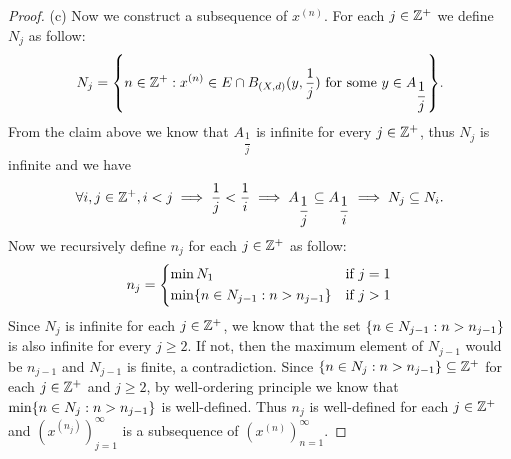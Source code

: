 \begin{proof}{(c)}
  Now we construct a subsequence of \(x^{(n)}\).
  For each \(j \in \mathbb{Z}^+\) we define \(N_j\) as follow:
  \[
    N_j = \set{n \in \Z^+ : x^{(n)} \in E \cap B_{(X, d)}(y, \dfrac{1}{j}) \text{ for some } y \in A_{\dfrac{1}{j}}}.
  \]
  From the claim above we know that \(A_{\dfrac{1}{j}}\) is infinite for every \(j \in \mathbb{Z}^+\), thus \(N_j\) is infinite and we have
  \[
    \forall i, j \in \mathbb{Z}^+, i < j \implies \dfrac{1}{j} < \dfrac{1}{i} \implies A_{\dfrac{1}{j}} \subseteq A_{\dfrac{1}{i}} \implies N_j \subseteq N_i.
  \]
  Now we recursively define \(n_j\) for each \(j \in \mathbb{Z}^+\) as follow:
  \[
    n_j = \begin{dcases}
      \min N_1                                  & \text{if } j = 1 \\
      \min\set{n \in N_{j - 1} : n > n_{j - 1}} & \text{if } j > 1
    \end{dcases}
  \]
  Since \(N_j\) is infinite for each \(j \in \mathbb{Z}^+\), we know that the set \(\left\lbrace n \in N_{j - 1} : n > n_{j - 1}\right\rbrace\) is also infinite for every \(j \geq 2\).
  If not, then the maximum element of \(N_{j - 1}\) would be \(n_{j - 1}\) and \(N_{j - 1}\) is finite, a contradiction.
  Since \(\left\lbrace n \in N_j : n > n_{j - 1}\right\rbrace \subseteq \mathbb{Z}^+\) for each \(j \in \mathbb{Z}^+\) and \(j \geq 2\), by well-ordering principle we know that \(\min\set{n \in N_j : n > n_{j - 1}}\) is well-defined.
  Thus \(n_j\) is well-defined for each \(j \in \mathbb{Z}^+\) and \((x^{(n_j)})_{j = 1}^\infty\) is a subsequence of \((x^{(n)})_{n = 1}^\infty\).


\end{proof}
